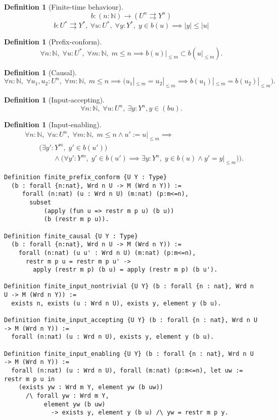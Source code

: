 \documentclass[11pt,a4paper]{article}
\newcommand{\N}{\mathbb{N}}
\newcommand{\mvto}{\rightrightarrows}
\newcommand{\len}[1]{{|#1|}}
\theoremstyle{theorem}
\theoremstyle{definition}
\newtheorem{definition}[theorem]{Definition}
\theoremstyle{remark}
\begin{document}
\begin{definition}[Finite-time behaviour]
\[ b : (n:\N) \to ( U^n \mvto Y^n) \]
  \[ b : U^* \mvto Y^*, \ \forall u:U^*,\; \forall y:Y^*,\; y \in b(u) \implies \len{y} \leq \len{u} \]
\end{definition}
\begin{definition}[Prefix-conform]
\[ \forall n:\N,\; \forall u : U^*,\; \forall m:\N,\; m\le n \implies
     b(u)|_{\leq m} \subset b(u|_{\leq m}) .\]
\end{definition}
\begin{definition}[Causal]
\[ \forall n:\N,\; \forall u_1,u_2 : U^n,\; \forall m:\N,\; m\le n \implies
    \bigl(u_1|_{\leq m} = u_2|_{\leq m} \implies b(u_1)|_{\leq m} = b(u_2)|_{\leq m} \bigr).\]
\end{definition}
\begin{definition}[Input-accepting]
\[ \forall n:\N,\; \forall u : U^n,\  \exists y : Y^n, y \in (b u). \]
\end{definition}
\begin{definition}[Input-enabling]
\[ \begin{aligned}
  & \forall n:\N,\; \forall u:U^n,\; \forall m:\N,\; m\leq n \wedge u' := u|_{\leq m} \implies \\
  & \qquad \bigl(\exists y' : Y^m,\; y' \in b(u') \bigr) \\ &\qquad\qquad \wedge \bigl( \forall y':Y^m,\; y'\in b(u') \implies \exists y:Y^n,\; y\in b(u) \wedge y'=y|_{\leq m} \bigr) \bigr). \end{aligned} \]
\end{definition}


\begin{verbatim}
Definition finite_prefix_conform {U Y : Type}
  (b : forall {n:nat}, Wrd n U -> M (Wrd n Y)) :=
     forall (n:nat) (u : Wrd n U) (m:nat) (p:m<=n),
       subset
           (apply (fun u => restr m p u) (b u))
           (b (restr m p u)).

Definition finite_causal {U Y : Type}
  (b : forall {n:nat}, Wrd n U -> M (Wrd n Y)) :=
    forall (n:nat) (u u' : Wrd n U) (m:nat) (p:m<=n),
      restr m p u = restr m p u' ->
        apply (restr m p) (b u) = apply (restr m p) (b u').

Definition finite_input_nontrivial {U Y} (b : forall {n : nat}, Wrd n U -> M (Wrd n Y)) :=
  exists n, exists (u : Wrd n U), exists y, element y (b u).

Definition finite_input_accepting {U Y} (b : forall {n : nat}, Wrd n U -> M (Wrd n Y)) :=
  forall (n:nat) (u : Wrd n U), exists y, element y (b u).

Definition finite_input_enabling {U Y} (b : forall {n : nat}, Wrd n U -> M (Wrd n Y)) :=
  forall (n:nat) (u : Wrd n U), forall (m:nat) (p:m<=n), let uw := restr m p u in
    (exists yw : Wrd m Y, element yw (b uw))
      /\ forall yw : Wrd m Y,
           element yw (b uw)
             -> exists y, element y (b u) /\ yw = restr m p y.
\end{verbatim}
\end{document}
